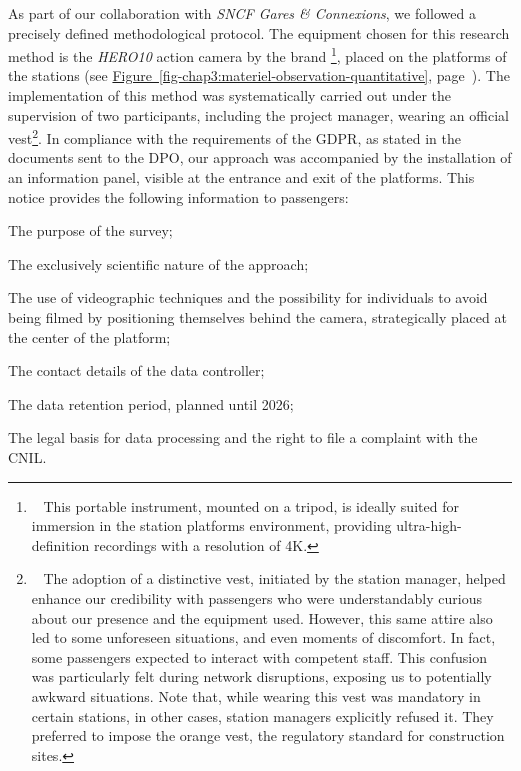 \begin{refsegment}
As part of our collaboration with \textsl{SNCF Gares \& Connexions}, we followed a precisely defined methodological protocol. The equipment chosen for this research method is the \textsl{HERO10} action camera by the brand \footnote{~
This portable instrument, mounted on a tripod, is ideally suited for immersion in the station platforms environment, providing ultra-high-definition recordings with a resolution of 4K.}, placed on the platforms of the stations (see \hyperref[fig-chap3:materiel-observation-quantitative]{Figure~\ref{fig-chap3:materiel-observation-quantitative}}, page~\pageref{fig-chap3:materiel-observation-quantitative}). The implementation of this method was systematically carried out under the supervision of two participants, including the project manager, wearing an official  vest\footnote{~
The adoption of a distinctive vest, initiated by the station manager, helped enhance our credibility with passengers who were understandably curious about our presence and the equipment used. However, this same attire also led to some unforeseen situations, and even moments of discomfort. In fact, some passengers expected to interact with competent staff. This confusion was particularly felt during network disruptions, exposing us to potentially awkward situations. Note that, while wearing this vest was mandatory in certain stations, in other cases, station managers explicitly refused it. They preferred to impose the orange vest, the regulatory standard for construction sites.
}. In compliance with the requirements of the \acrshort{GDPR}, as stated in the documents sent to the \acrshort{DPO}, our approach was accompanied by the installation of an information panel, visible at the entrance and exit of the platforms. This notice provides the following information to passengers:
    \begin{customitemize}
\item The purpose of the survey;
\item The exclusively scientific nature of the approach;
\item The use of videographic techniques and the possibility for individuals to avoid being filmed by positioning themselves behind the camera, strategically placed at the center of the platform;
\item The contact details of the data controller;
\item The data retention period, planned until 2026;
\item The legal basis for data processing and the right to file a complaint with the \acrshort{CNIL}.
    \end{customitemize}%


\end{refsegment}
